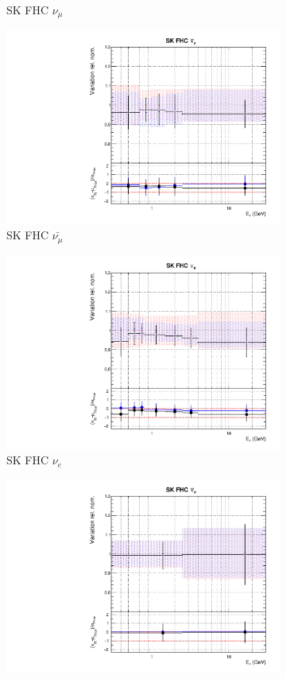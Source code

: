 \begin{figure}[t]
\begin{subfigure}{0.42\textwidth}
  \caption{SK FHC $\nu_{\mu}$}
\end{subfigure}
\begin{subfigure}{0.42\textwidth}
  \centering
  \includegraphics[width=0.75\linewidth]{figs/rhcmpasmvflux9}
  \caption{SK FHC $\bar{\nu_{\mu}}$}
\end{subfigure}
\begin{subfigure}{0.42\textwidth}
  \centering
  \includegraphics[width=0.75\linewidth]{figs/rhcmpasmvflux10}
  \caption{SK FHC $\nu_e$}
\end{subfigure}
\begin{subfigure}{0.42\textwidth}
  \centering
  \includegraphics[width=0.75\linewidth]{figs/rhcmpasmvflux11}

\end{subfigure}
\end{figure}
